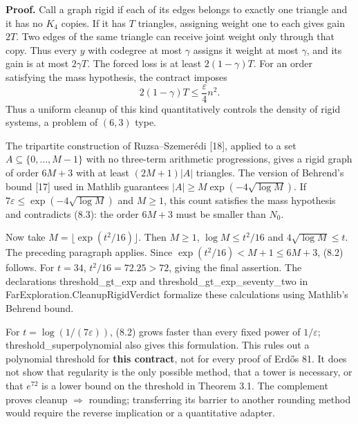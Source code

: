 \documentclass[english,11pt,a4paper]{article}
\begin{document}
\textbf{Proof.} Call a graph rigid if each of its edges belongs to exactly one triangle and it has no \(K_4\) copies. If it has \(T\) triangles, assigning weight one to each gives gain \(2T\). Two edges of the same triangle can receive joint weight only through that copy. Thus every \(y\) with codegree at most \(\gamma\) assigns it weight at most \(\gamma\), and its gain is at most \(2\gamma T\). The forced loss is at least \(2(1-\gamma)T\). For an order satisfying the mass hypothesis, the contract imposes \[
2(1-\gamma)T\le\frac{\varepsilon}{4}n^2.
\tag{8.3}
\] Thus a uniform cleanup of this kind quantitatively controls the density of rigid systems, a problem of \((6,3)\) type.

The tripartite construction of Ruzsa--Szemerédi {[}18{]}, applied to a set \(A\subseteq\{0,\ldots,M-1\}\) with no three-term arithmetic progressions, gives a rigid graph of order \(6M+3\) with at least \((2M+1)|A|\) triangles. The version of Behrend's bound {[}17{]} used in Mathlib guarantees \(|A|\ge M\exp(-4\sqrt{\log M})\). If \(7\varepsilon\le\exp(-4\sqrt{\log M})\) and \(M\ge1\), this count satisfies the mass hypothesis and contradicts (8.3): the order \(6M+3\) must be smaller than \(N_0\).

Now take \(M=\lfloor\exp(t^2/16)\rfloor\). Then \(M\ge1\), \(\log M\le t^2/16\) and \(4\sqrt{\log M}\le t\). The preceding paragraph applies. Since \(\exp(t^2/16)<M+1\le6M+3\), (8.2) follows. For \(t=34\), \(t^2/16=72.25>72\), giving the final assertion. The declarations {\ttfamily\small threshold\_\discretionary{\hbox{\ensuremath{\hookrightarrow}}}{}{}gt\_\discretionary{\hbox{\ensuremath{\hookrightarrow}}}{}{}exp} and {\ttfamily\small threshold\_\discretionary{\hbox{\ensuremath{\hookrightarrow}}}{}{}gt\_\discretionary{\hbox{\ensuremath{\hookrightarrow}}}{}{}exp\_\discretionary{\hbox{\ensuremath{\hookrightarrow}}}{}{}seventy\_\discretionary{\hbox{\ensuremath{\hookrightarrow}}}{}{}two} in {\ttfamily\small FarExplorati\discretionary{\hbox{\ensuremath{\hookrightarrow}}}{}{}on.\discretionary{\hbox{\ensuremath{\hookrightarrow}}}{}{}CleanupRigid\discretionary{\hbox{\ensuremath{\hookrightarrow}}}{}{}Verdict} formalize these calculations using Mathlib's Behrend bound.

For \(t=\log(1/(7\varepsilon))\), (8.2) grows faster than every fixed power of \(1/\varepsilon\); {\ttfamily\small threshold\_\discretionary{\hbox{\ensuremath{\hookrightarrow}}}{}{}superpolynom\discretionary{\hbox{\ensuremath{\hookrightarrow}}}{}{}ial} also gives this formulation. This rules out a polynomial threshold for \textbf{this contract}, not for every proof of Erdős 81. It does not show that regularity is the only possible method, that a tower is necessary, or that \(e^{72}\) is a lower bound on the threshold in Theorem 3.1. The complement proves cleanup \(\Rightarrow\) rounding; transferring its barrier to another rounding method would require the reverse implication or a quantitative adapter.
\end{document}
